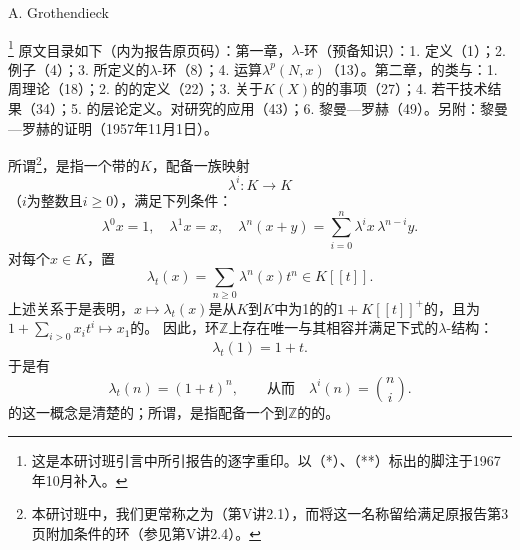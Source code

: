 \begin{center}A. Grothendieck\end{center}
\footnote{这是本研讨班引言中所引报告的逐字重印。以（*）、（**）标出的脚注于1967年10月补入。}
原文目录如下（内为报告原页码）：第一章，$\lambda$-环（预备知识）：1. 定义（1）；2. 例子（4）；3. 所定义的$\lambda$-环（8）；4. 运算$\lambda^p(N,x)$（13）。第二章，的类与：1. 周理论（18）；2. 的的定义（22）；3. 关于$K(X)$的的事项（27）；4. 若干技术结果（34）；5. 的层论定义。对研究的应用（43）；6. 黎曼—罗赫（49）。另附：黎曼—罗赫的证明（1957年11月1日）。

所谓\footnote{本研讨班中，我们更常称之为（第V讲2.1），而将这一名称留给满足原报告第3页附加条件的环（参见第V讲2.4）。}，是指一个带的$K$，配备一族映射
\begin{equation}\lambda^i:K\longrightarrow K\tag{1.1}\end{equation}
（$i$为整数且$i\geq0$），满足下列条件：
\begin{equation}\lambda^0x=1,\quad\lambda^1x=x,\quad
\lambda^n(x+y)=\sum_{i=0}^n\lambda^ix\,\lambda^{n-i}y.\tag{1.2}\end{equation}
对每个$x\in K$，置
\begin{equation}\lambda_t(x)=\sum_{n\geq0}\lambda^n(x)t^n\in K[[t]].\tag{1.3}\end{equation}
上述关系于是表明，$x\mapsto\lambda_t(x)$是从$K$到$K$中为1的的$1+K[[t]]^+$的，且为$1+\sum_{i>0}x_it^i\mapsto x_1$的。
因此，环$\mathbb Z$上存在唯一与其相容并满足下式的$\lambda$-结构：
\begin{equation}\lambda_t(1)=1+t.\tag{1.4}\end{equation}
于是有
\begin{equation}\lambda_t(n)=(1+t)^n,\qquad\text{从而}\quad\lambda^i(n)=\binom ni.\tag{1.5}\end{equation}
的这一概念是清楚的；所谓，是指配备一个到$\mathbb Z$的的。

